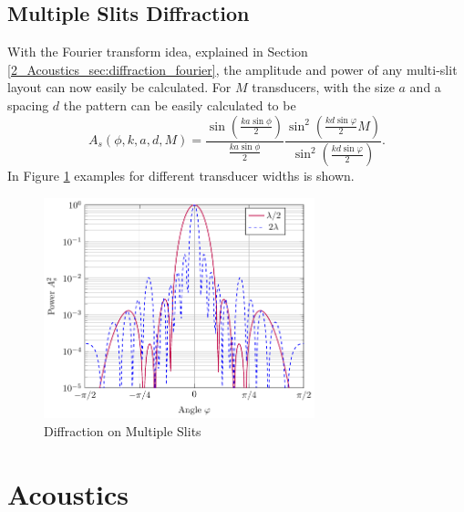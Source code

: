 \subsection{Multiple Slits Diffraction}
With the Fourier transform idea, explained in Section \ref{2_Acoustics_sec:diffraction_fourier}, the amplitude and power of any multi-slit layout can now easily be calculated. 
For $M$ transducers, with the size $a$ and a spacing $d$ the pattern can be easily calculated to be
\begin{equation}
     A_s(\phi, k, a, d, M)
     =
     \frac{\sin \left ( \frac{ka \sin \phi}{2}\right )}{ \frac{ka \sin \phi}{2}} \frac{\sin^2\left( \frac{k d \sin{\varphi}}{2}M\right )}{\sin^2\left( \frac{k d \sin{\varphi}}{2}\right )}.
\end{equation}
In Figure \ref{6_fig:multiple_diffraction} examples for different transducer widths is shown.
\begin{figure}[h!]
    \centering
    \includegraphics[width=0.7\textwidth]{images/2_Preliminaries/Multiple_Slid_Count.pdf}
    \caption{Diffraction on Multiple Slits}
    \label{6_fig:multiple_diffraction}
\end{figure}

\newpage
\section{Acoustics}

